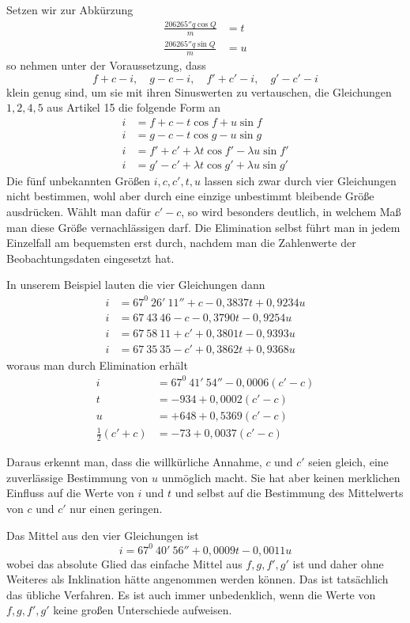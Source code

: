Setzen wir zur Abkürzung
\[
\begin{aligned}
\frac{206265''q\cos Q}{m}&=t\\
\frac{206265''q\sin Q}{m}&=u
\end{aligned}
\]
so nehmen unter der Voraussetzung, dass
\[
f+c-i,\quad g-c-i,\quad f'+c'-i,\quad g'-c'-i
\]
klein genug sind, um sie mit ihren Sinuswerten zu vertauschen, die Gleichungen $1,2,4,5$ aus Artikel 15 die folgende Form an
\[
\begin{aligned}
i&=f+c-t\cos f+u\sin f\\
i&=g-c-t\cos g-u\sin g\\
i&=f'+c'+\lambda t\cos f'-\lambda u\sin f'\\
i&=g'-c'+\lambda t\cos g'+\lambda u\sin g'
\end{aligned}
\]
Die fünf unbekannten Größen $i,c,c',t,u$ lassen sich zwar durch vier Gleichungen nicht bestimmen, wohl aber durch eine einzige unbestimmt bleibende Größe ausdrücken. Wählt man dafür $c'-c$, so wird besonders deutlich, in welchem Maß man diese Größe vernachlässigen darf. Die Elimination selbst führt man in jedem Einzelfall am bequemsten erst durch, nachdem man die Zahlenwerte der Beobachtungsdaten eingesetzt hat.

In unserem Beispiel lauten die vier Gleichungen dann
\[
\begin{aligned}
i&=67^0\ 26'\ 11''+c-0{,}3837t+0{,}9234u\\
i&=67\ 43\ 46-c-0{,}3790t-0{,}9254u\\
i&=67\ 58\ 11+c'+0{,}3801t-0{,}9393u\\
i&=67\ 35\ 35-c'+0{,}3862t+0{,}9368u
\end{aligned}
\]
woraus man durch Elimination erhält
\[
\begin{aligned}
i&=67^0\ 41'\ 54''-0{,}0006(c'-c)\\
t&=-934+0{,}0002(c'-c)\\
u&=+648+0{,}5369(c'-c)\\
\tfrac12(c'+c)&=-73+0{,}0037(c'-c)
\end{aligned}
\]

Daraus erkennt man, dass die willkürliche Annahme, $c$ und $c'$ seien gleich, eine zuverlässige Bestimmung von $u$ unmöglich macht. Sie hat aber keinen merklichen Einfluss auf die Werte von $i$ und $t$ und selbst auf die Bestimmung des Mittelwerts von $c$ und $c'$ nur einen geringen.

Das Mittel aus den vier Gleichungen ist
\[
i=67^0\ 40'\ 56''+0{,}0009t-0{,}0011u
\]
wobei das absolute Glied das einfache Mittel aus $f,g,f',g'$ ist und daher ohne Weiteres als Inklination hätte angenommen werden können. Das ist tatsächlich das übliche Verfahren. Es ist auch immer unbedenklich, wenn die Werte von $f,g,f',g'$ keine großen Unterschiede aufweisen.

